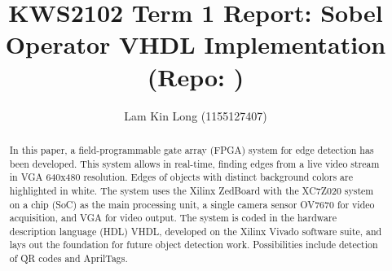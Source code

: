 \documentclass{IEEEtran}
\title{KWS2102 Term 1 Report: Sobel Operator VHDL Implementation (Repo: \aaa{https://github.com/slypiggies/fyp}{\faGithub})}
\author{Lam Kin Long (1155127407)}
\begin{document}
	\maketitle
	\begin{abstract}
		In this paper, a field-programmable gate array (FPGA) system for edge detection has been developed. This system allows in real-time, finding edges from a live video stream in VGA 640x480 resolution. Edges of objects with distinct background colors are highlighted in white. The system uses the Xilinx ZedBoard with the XC7Z020 system on a chip (SoC) as the main processing unit, a single camera sensor OV7670 for video acquisition, and VGA \cite{vga} for video output. The system is coded in the hardware description language (HDL) VHDL, developed on the Xilinx Vivado software suite, and lays out the foundation for future object detection work. Possibilities include detection of QR codes and AprilTags.
	\end{abstract}
\end{document}
